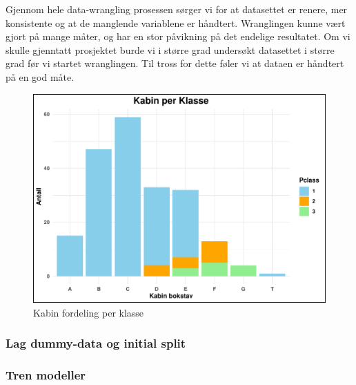 \documentclass[
]{article}
\newenvironment{Shaded}{\begin{snugshade}}{\end{snugshade}}
\newcommand{\FunctionTok}[1]{\textcolor[rgb]{0.13,0.29,0.53}{\textbf{#1}}}
\newcommand{\NormalTok}[1]{#1}
\newcommand{\OtherTok}[1]{\textcolor[rgb]{0.56,0.35,0.01}{#1}}
\newcommand{\SpecialCharTok}[1]{\textcolor[rgb]{0.81,0.36,0.00}{\textbf{#1}}}
\begin{document}
Gjennom hele data-wrangling prosessen sørger vi for at datasettet er
renere, mer konsistente og at de manglende variablene er håndtert.
Wranglingen kunne vært gjort på mange måter, og har en stor påvikning på
det endelige resultatet. Om vi skulle gjenntatt prosjektet burde vi i
større grad undersøkt datasettet i større grad før vi startet
wranglingen. Til tross for dette føler vi at dataen er håndtert på en
god måte.

\begin{figure}[H]

{\centering \includegraphics[width=0.8\linewidth]{presentation_files/figure-latex/unnamed-chunk-7-1} 

}

\caption{Kabin fordeling per klasse}\label{fig:unnamed-chunk-7}
\end{figure}

\subsubsection{Lag dummy-data og initial
split}\label{lag-dummy-data-og-initial-split}

\begin{Shaded}
\end{Shaded}

\subsubsection{Tren modeller}\label{tren-modeller}
\end{document}
